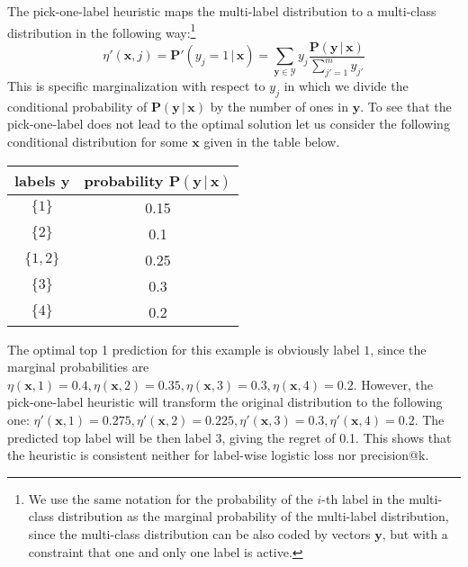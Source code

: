 \documentclass{article}
\renewcommand{\vec}[1]{\boldsymbol{#1}}
\newcommand{\bx}{\vec{x}}
\newcommand{\by}{\vec{y}}
\newcommand{\calY}{\mathcal{Y}}
\newcommand{\prob}{\mathbf{P}}
\newcommand{\given}{\, | \,}
\begin{document}
The pick-one-label heuristic maps the multi-label distribution to a multi-class distribution in the following way:\footnote{We use the same notation for the probability of the $i$-th label in the multi-class distribution as the marginal probability of the multi-label distribution, since the multi-class distribution can be also coded by vectors $\by$, but with a constraint that one and only one label is active.}
\begin{equation}
\eta'(\bx, j) = \prob'(y_j = 1 \given \bx) = \sum_{\by \in \calY} y_j \frac{\prob(\by \given \bx)}{\sum_{j'=1}^m y_{j'}}
\label{eq:heuristic}
\end{equation}
This is specific marginalization with respect to $y_j$ in which we divide the conditional probability of  $\prob(\by \given \bx)$ by the number of ones in $\by$. To see that the pick-one-label does not lead to the optimal solution let us consider the following conditional distribution for some $\bx$ given in the table below.
\begin{center}
\begin{tabular}{c c}
\toprule
labels $\by$ & probability $\prob(\by \given \bx)$ \\
\midrule
$\{1\}$ & 0.15 \\
$\{2\}$ & 0.1 \\
$\{1, 2\}$ & 0.25 \\
$\{3\}$ & 0.3 \\
$\{4\}$ & 0.2 \\
\bottomrule
\end{tabular}
\end{center}
The optimal top 1 prediction for this example is obviously label $1$, since the marginal probabilities are $\eta(\bx,1) = 0.4, \eta(\bx,2) = 0.35,  \eta(\bx,3) = 0.3, \eta(\bx,4) =0.2$. However, the pick-one-label heuristic will transform the original distribution to the following one: $\eta'(\bx,1) = 0.275, \eta'(\bx,2) = 0.225,  \eta'(\bx,3) = 0.3, \eta'(\bx,4) =0.2$. The predicted top label will be then label $3$, giving the regret of 0.1. This shows that the heuristic is consistent neither for label-wise logistic loss nor precision@k. 

\end{document}

